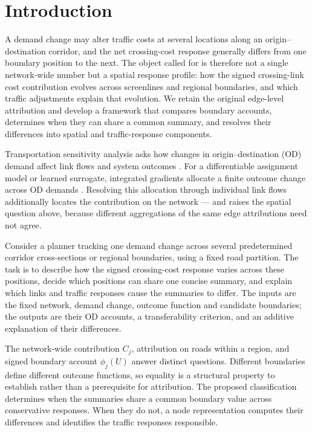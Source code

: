 \documentclass[a4paper,fleqn]{cas-sc}
\begin{document}
\section{Introduction}\label{sec:intro}
A demand change may alter traffic costs at several locations along an
origin--destination corridor, and the net crossing-cost response
generally differs from one boundary position to the next. The object
called for is therefore not a single network-wide number but a spatial
response profile: how the signed crossing-link cost contribution
evolves across screenlines and regional boundaries, and which traffic
adjustments explain that evolution. We retain the original edge-level
attribution and develop a framework that compares boundary accounts,
determines when they can share a common summary, and resolves their
differences into spatial and traffic-response components.

Transportation sensitivity analysis asks how changes in origin--destination
(OD) demand affect link flows and system outcomes
\citep{tobin1988sensitivity,josefsson2007sensitivity,patriksson2003aggregated}.
For a differentiable assignment model or learned surrogate, integrated
gradients allocate a finite outcome change across OD demands
\citep{sundararajan2017axiomatic}. Resolving this allocation through
individual link flows additionally locates the contribution on the
network --- and raises the spatial question above, because different
aggregations of the same edge attributions need not agree.

Consider a planner tracking one demand change across several
predetermined corridor cross-sections or regional boundaries, using a
fixed road partition. The task is to describe how the signed
crossing-cost response varies across these positions, decide which
positions can share one concise summary, and explain which links and
traffic responses cause the summaries to differ. The inputs are the
fixed network, demand change, outcome function and candidate
boundaries; the outputs are their OD accounts, a transferability
criterion, and an additive explanation of their differences.

The network-wide contribution $C_j$, attribution on roads within a region,
and signed boundary account $\phi_j(U)$ answer distinct questions.
Different boundaries define different outcome functions, so equality is a
structural property to establish rather than a prerequisite for attribution.
The proposed classification determines when the summaries share a common
boundary value across conservative responses. When they do not, a node
representation computes their differences and identifies the traffic
responses responsible.
\end{document}
